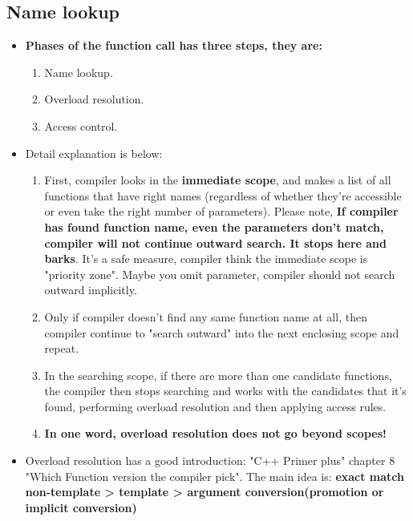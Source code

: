\documentclass[a4paper,11pt,twoside]{book}
\begin{document}
\subsection{Name lookup}
\begin{itemize}
	
	\item \textbf{Phases of the function call has three steps, they are:}
	\begin{enumerate}
		\item Name lookup.
		\item Overload resolution.
		\item Access control.
	\end{enumerate}
	
	\item Detail explanation is below:
	\begin{enumerate}
		\item First, compiler looks in the \textbf{immediate scope},  and makes a list of all functions that have right names  (regardless of whether they're accessible or even take the right number of parameters). Please note, \textbf{If compiler has found function name, even the parameters don't match, compiler will not continue outward search. It stops here and barks}. It's a safe measure, compiler think the immediate scope is "priority zone". Maybe you omit parameter, compiler should not search outward implicitly. 
		
		\item Only if compiler doesn't find any same function name at all, then compiler continue to "search outward" into the next enclosing scope and repeat.
		
		\item In the searching scope, if there are more than one candidate functions, the compiler then stops searching and works with the candidates that it's found, performing overload resolution and then applying access rules.
		
		\item \textbf{In one word, overload resolution does not go beyond scopes!}
	\end{enumerate}
	
	
	\item Overload resolution has a good introduction: "C++ Primer plus" chapter 8 "Which Function version the compiler pick". The main idea is: \textbf{exact match non-template > template > argument conversion(promotion or implicit conversion)}
	
\end{itemize}
\end{document}
